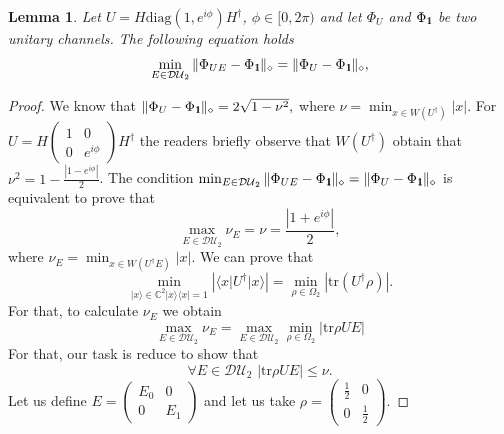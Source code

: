 \documentclass[preprint,12pt, a4paper]{elsarticle}
\newcommand{\ket}[1]{\ensuremath{|#1\rangle}}
\newcommand{\bra}[1]{\ensuremath{\langle#1|}}
\newcommand{\ketbra}[2]{\ensuremath{\ket{#1}\bra{#2}}}
\newcommand{\proj}[1]{\ensuremath{\ketbra{#1}{#1}}}
\newcommand{\1}{{\rm 1\hspace{-0.9mm}l}}
\newcommand{\Id}{{\rm 1\hspace{-0.9mm}l}}
\newcommand{\diaguni}{\ensuremath{\mathcal{DU}}}
\newcommand{\diag}{\mathrm{diag}}
\newcommand{\tr}{\mathrm{tr}}
\newtheorem{lemma}{Lemma}
\begin{document}
\begin{lemma}\label{lemma:min-e-optimal}
 Let $U = H \diag(1, e^{i \phi}) H^\dagger$, $\phi \in [0, 2\pi)$ and	let 
 $\Phi_U$ and $\Phi_\Id$ be two unitary channels. The following equation holds 
	\begin{equation}
	\min_{E \in \diaguni_2} \|\Phi_{UE} - 
	\Phi_\Id\|_\diamond = \|\Phi_{U} - 
	\Phi_\Id\|_\diamond,
	\end{equation}

\end{lemma}
\begin{proof} We know that
$
	\| \Phi_U  - \Phi_{\1} \|_\diamond = 2 \sqrt{1-\nu^2},
$
	where $\nu = \min_{x \in W(U^\dagger)} |x|  $. For $U = H 
	\left(\begin{array}{cc}1&0\\0&e^{i \phi}\end{array}\right)  H^\dagger$ the readers briefly observe that $W(U^\dagger) $ 
	obtain that $\nu^2 = 1 - \frac{|1 - e^{i \phi} | }{2}$. 
	The condition $ 	\min_{E \in \diaguni_2} \|\Phi_{UE} - 
	\Phi_\Id\|_\diamond = \|\Phi_{U} - 
	\Phi_\Id\|_\diamond $ is equivalent to prove that
	\begin{equation}
	\max_{E \in \diaguni_2 } \nu_E = \nu = \frac{|1 + e^{i \phi} | }{2},
	\end{equation}
	where $\nu_E = \min_{x \in W(U^\dagger E)} |x|. $ We can prove that
	\begin{equation}
	\min_{\ket{x} \in \mathbb{C}^2  \proj{x} = 1} |\bra{x}U^\dagger\ket{x}| = 
	\min_{\rho \in \Omega_2} |\tr(U^\dagger\rho)|. 
	\end{equation}
For that, to calculate $\nu_E$ we obtain \begin{equation}
	\max_{E \in \diaguni_2 } \nu_E  = \max_{E \in \diaguni_2 }  \min_{\rho \in 
	\Omega_2} \left| \tr \rho U E  \right|
\end{equation}
For that, our task is reduce to show that
	\begin{equation}
	\forall E \in \diaguni_2 \,\, | \tr \rho U E | \le \nu. 
	\end{equation}
	Let us define $E = \left(\begin{array}{cc}E_0&0\\0&E_1\end{array}\right)  $ 
	and let us take $\rho = 
	\left(\begin{array}{cc}\frac{1}{2}&0\\0&\frac{1}{2}\end{array}\right) $. 

\end{proof}
\end{document}
